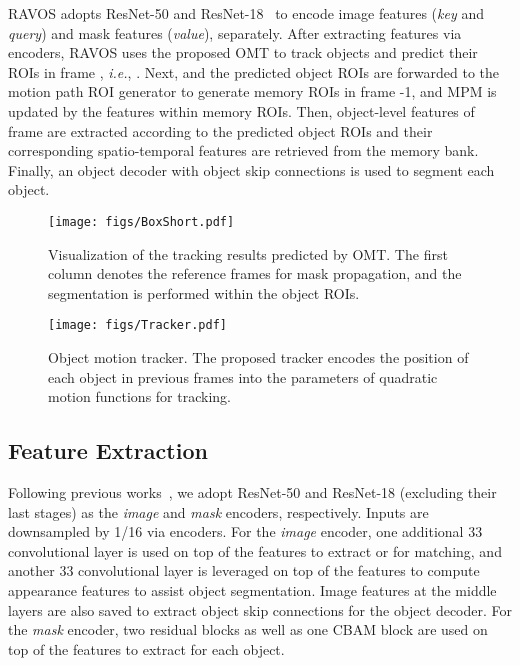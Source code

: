 \documentclass[journal]{IEEEtran}
\def\ie{\emph{i.e.}}
\begin{document}
RAVOS adopts ResNet-50 and ResNet-18~\cite{ResNet} to encode image features (\textit{key} and \textit{query}) and mask features (\textit{value}), separately. After extracting features via encoders, RAVOS uses the proposed OMT to track objects and predict their ROIs in frame , \ie, . Next,  and the predicted object ROIs  are forwarded to the motion path ROI generator to generate memory ROIs in frame -1, and MPM is updated by the features within memory ROIs. Then, object-level features of frame  are extracted according to the predicted object ROIs  and their corresponding spatio-temporal features are retrieved from the memory bank. Finally, an object decoder with object skip connections is used to segment each object. 


\begin{figure*}[t]
\centering
\texttt{[image: figs/BoxShort.pdf]}
\caption{Visualization of the tracking results predicted by OMT. The first column denotes the reference frames for mask propagation, and the segmentation is performed within the object ROIs.} 
\label{fig:trackerresults}
\end{figure*}



\begin{figure}[t]
\centering
\texttt{[image: figs/Tracker.pdf]}
\caption{Object motion tracker. The proposed tracker encodes the position of each object in previous frames into the parameters of quadratic motion functions for tracking.}
\label{fig:trackerarchitecture}
\end{figure}



\subsection{Feature Extraction}
Following previous works~\cite{STCN,STM}, we adopt ResNet-50 and ResNet-18 (excluding their last stages) \cite{ResNet} as the \emph{image} and \emph{mask} encoders, respectively. Inputs are downsampled by 1/16 via encoders. For the \emph{image} encoder, one additional 33 convolutional layer is used on top of the  features to extract   or   for matching, and another 33 convolutional layer is leveraged on top of the  features to compute appearance features  to assist object segmentation. Image features at the middle layers are also saved to extract object skip connections for the object decoder. For the \emph{mask} encoder, two residual blocks as well as one CBAM block \cite{CBAM} are used on top of the  features to extract   for each object.
\end{document}
